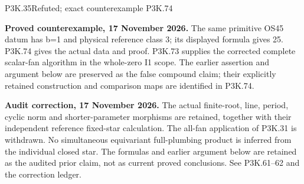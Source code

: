 \begin{statement}{P3K.35}{Refuted; exact counterexample P3K.74}
\par\noindent\textbf{Proved counterexample, 17 November 2026.} The same primitive OS45 datum has b=1 and physical reference class 3; its displayed formula gives 25. P3K.74 gives the actual data and proof. P3K.73 supplies the corrected complete scalar-fan algorithm in the whole-zero I1 scope. The earlier assertion and argument below are preserved as the false compound claim; their explicitly retained construction and comparison maps are identified in P3K.74.

\par\noindent\textbf{Audit correction, 17 November 2026.} The actual finite-root, line, period, cyclic norm and shorter-parameter morphisms are retained, together with their independent reference fixed-star calculation. The all-fan application of P3K.31 is withdrawn. No simultaneous equivariant full-plumbing product is inferred from the individual closed star. The formulas and earlier argument below are retained as the audited prior claim, not as current proved conclusions. See P3K.61--62 and the correction ledger.
\medskip


\end{statement}
